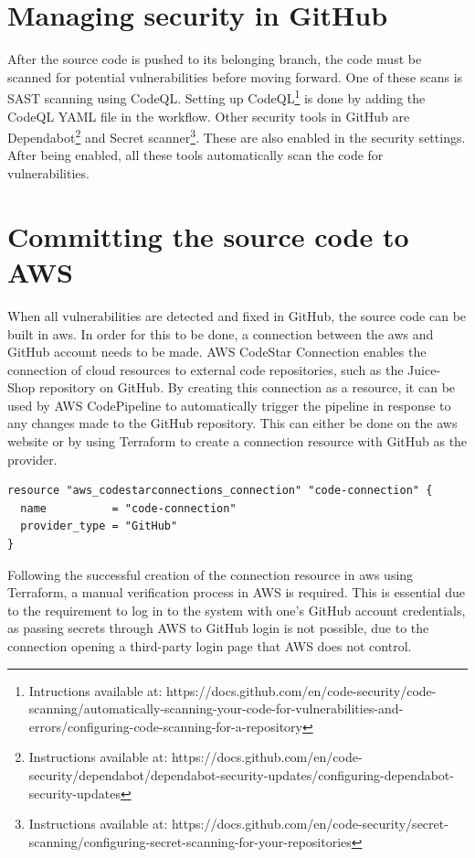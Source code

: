 \section{Managing security in GitHub}
After the source code is pushed to its belonging branch, the code must be scanned for potential vulnerabilities before moving forward. One of these scans is SAST scanning using CodeQL. Setting up CodeQL\footnote{Intructions available at: https://docs.github.com/en/code-security/code-scanning/automatically-scanning-your-code-for-vulnerabilities-and-errors/configuring-code-scanning-for-a-repository} is done by adding the CodeQL YAML file in the workflow. Other security tools in GitHub are Dependabot\footnote{Instructions available at: https://docs.github.com/en/code-security/dependabot/dependabot-security-updates/configuring-dependabot-security-updates} and Secret scanner\footnote{Instructions available at: https://docs.github.com/en/code-security/secret-scanning/configuring-secret-scanning-for-your-repositories}. These are also enabled in the security settings. After being enabled, all these tools automatically scan the code for vulnerabilities. 

\section{Committing the source code to AWS}
When all vulnerabilities are detected and fixed in GitHub, the source code can be built in \acrshort{aws}. In order for this to be done, a connection between the \acrshort{aws} and GitHub account needs to be made. AWS CodeStar Connection enables the connection of cloud resources to external code repositories, such as the Juice-Shop repository on GitHub. By creating this connection as a resource, it can be used by AWS CodePipeline to automatically trigger the pipeline in response to any changes made to the GitHub repository.
This can either be done on the \acrshort{aws} website or by using Terraform to create a connection resource with GitHub as the provider. 

\begin{tcolorbox}
\begin{verbatim}
resource "aws_codestarconnections_connection" "code-connection" {
  name          = "code-connection"
  provider_type = "GitHub"
}    
\end{verbatim}
\end{tcolorbox}

Following the successful creation of the connection resource in \acrshort{aws} using Terraform, a manual verification process in AWS is required. This is essential due to the requirement to log in to the system with one's GitHub account credentials, as passing secrets through AWS to GitHub login is not possible, due to the connection opening a third-party login page that AWS does not control.

